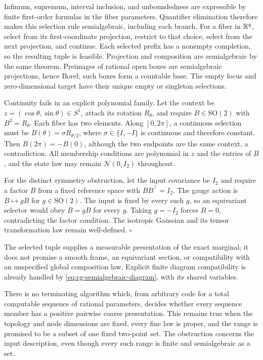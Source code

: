 Infimum, supremum, interval inclusion, and unboundedness
are expressible by finite first-order formulas in the
fiber parameters. Quantifier elimination therefore makes
this selection rule semialgebraic, including each branch.
For a fiber in \(\mathbb R^q\), select from its first-coordinate
projection, restrict to that choice, select from the next
projection, and continue. Each selected prefix has a
nonempty completion, so the resulting tuple is feasible.
Projection and composition are semialgebraic by the same
theorem. Preimages of rational open boxes are semialgebraic
projections, hence Borel; such boxes form a countable base.
The empty locus and zero-dimensional target have their
unique empty or singleton selections.

Continuity fails in an explicit polynomial family. Let the
context be \(z=(\cos\theta,\sin\theta)\in S^1\), attach its
rotation \(R_\theta\), and require \(B\in\mathrm{SO}(2)\)
with \(B^2=R_\theta\). Each fiber has two elements. Along
\([0,2\pi]\), a continuous selection must be
\(B(\theta)=\sigma R_{\theta/2}\), where
\(\sigma\in\{I,-I\}\) is continuous and therefore constant.
Then \(B(2\pi)=-B(0)\), although the two endpoints are the
same context, a contradiction. All membership conditions
are polynomial in \(z\) and the entries of \(B\), and the
state law may remain \(\mathcal N(0,I_2)\) throughout.

For the distinct symmetry obstruction, let the input
covariance be \(I_2\) and require a factor \(B\) from a
fixed reference space with \(BB^\top=I_2\). The gauge
action is \(B\mapsto gB\) for \(g\in\mathrm{SO}(2)\).
The input is fixed by every such \(g\), so an equivariant
selector would obey \(B=gB\) for every \(g\). Taking
\(g=-I_2\) forces \(B=0\), contradicting the factor
condition. The isotropic Gaussian and its tensor
transformation law remain well-defined. \(\square\)

The selected tuple supplies a measurable presentation of
the exact marginal; it does not promise a smooth frame,
an equivariant section, or compatibility with an
unspecified global composition law. Explicit finite
diagram compatibility is already handled by
\eqref{eq:cg-semialgebraic-diagram}, with its shared variables.

There is no terminating algorithm which, from arbitrary
code for a total computable sequence of rational parameters,
decides whether every sequence member has a positive
pairwise coarse presentation. This remains true when the
topology and node dimensions are fixed, every fine law is
proper, and the range is promised to be a subset of one
fixed two-point set. The obstruction concerns the input
description, even though every such range is finite and
semialgebraic as a set. 

